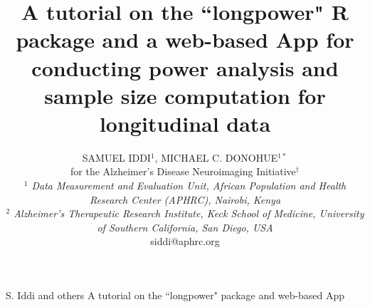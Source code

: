 \documentclass[oupdraft]{bio}
\begin{document}
	
	\title{A tutorial on the ``longpower" R package and a web-based App for conducting power analysis and sample size computation for longitudinal data}
	
	\author{SAMUEL IDDI$^1$, MICHAEL C. DONOHUE$^{1\ast}$\\[4pt]
		for the Alzheimer's Disease Neuroimaging Initiative$^\dagger$\\[4pt]
		\textit{$^1$ Data Measurement and Evaluation Unit,
			African Population and Health Research Center (APHRC),
			Nairobi, Kenya\\
		$^2$ 	Alzheimer's Therapeutic Research Institute,
		Keck School of Medicine,
		University of Southern California,
		San Diego, USA}
		\\[2pt]
		{siddi@aphrc.org}}
	
	\markboth%
	{S. Iddi and others}
	{A tutorial on the ``longpower" package and web-based App}
	
	\maketitle
	
	
\end{document}
